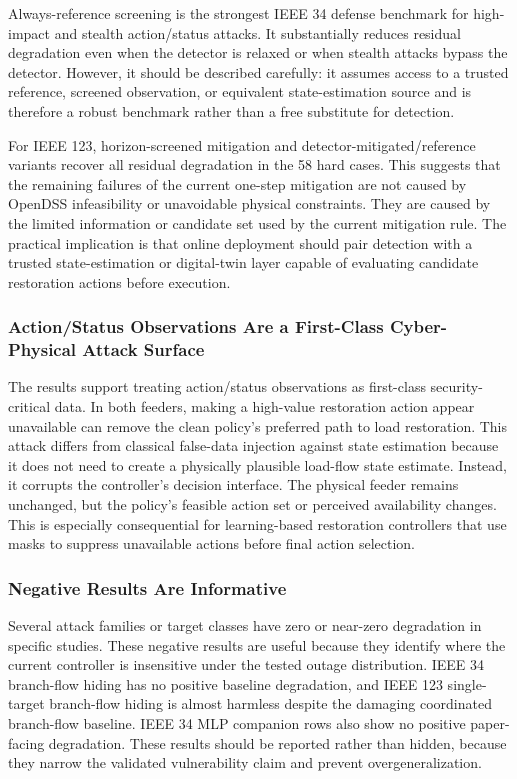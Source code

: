 Always-reference screening is the strongest IEEE 34 defense benchmark for high-impact and stealth action/status attacks. It substantially reduces residual degradation even when the detector is relaxed or when stealth attacks bypass the detector. However, it should be described carefully: it assumes access to a trusted reference, screened observation, or equivalent state-estimation source and is therefore a robust benchmark rather than a free substitute for detection.

For IEEE 123, horizon-screened mitigation and detector-mitigated/reference variants recover all residual degradation in the 58 hard cases. This suggests that the remaining failures of the current one-step mitigation are not caused by OpenDSS infeasibility or unavoidable physical constraints. They are caused by the limited information or candidate set used by the current mitigation rule. The practical implication is that online deployment should pair detection with a trusted state-estimation or digital-twin layer capable of evaluating candidate restoration actions before execution.

\subsubsection{Action/Status Observations Are a First-Class Cyber-Physical Attack Surface}
\label{subsubsec:action_status_attack_surface}

The results support treating action/status observations as first-class security-critical data. In both feeders, making a high-value restoration action appear unavailable can remove the clean policy's preferred path to load restoration. This attack differs from classical false-data injection against state estimation because it does not need to create a physically plausible load-flow state estimate. Instead, it corrupts the controller's decision interface. The physical feeder remains unchanged, but the policy's feasible action set or perceived availability changes. This is especially consequential for learning-based restoration controllers that use masks to suppress unavailable actions before final action selection.

\subsubsection{Negative Results Are Informative}
\label{subsubsec:negative_results}

Several attack families or target classes have zero or near-zero degradation in specific studies. These negative results are useful because they identify where the current controller is insensitive under the tested outage distribution. IEEE 34 branch-flow hiding has no positive baseline degradation, and IEEE 123 single-target branch-flow hiding is almost harmless despite the damaging coordinated branch-flow baseline. IEEE 34 MLP companion rows also show no positive paper-facing degradation. These results should be reported rather than hidden, because they narrow the validated vulnerability claim and prevent overgeneralization.


